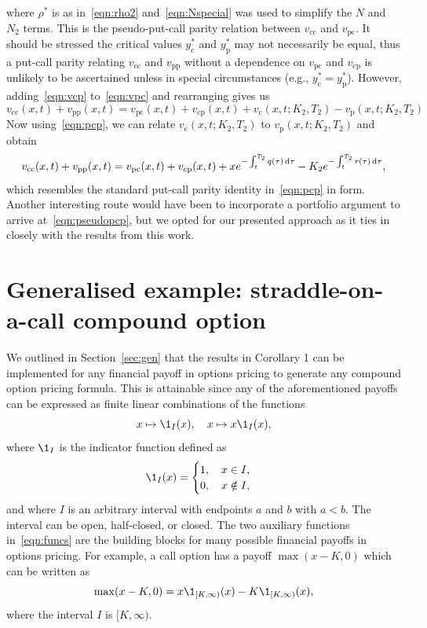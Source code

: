 where $\rho^*$ is as in~\eqref{eqn:rho2} and~\eqref{eqn:Nspecial} was used to simplify the $N$ and $N_2$ terms. This is the pseudo-put-call parity relation between $v_\text{cc}$ and $v_\text{pc}$. It should be stressed the critical values $y_\text{c}^*$ and $y_\text{p}^*$ may not necessarily be equal, thus a put-call parity relating $v_\text{cc}$ and $v_\text{pp}$ without a dependence on $v_\text{pc}$ and $v_\text{cp}$ is unlikely to be ascertained unless in special circumstances (e.g., $y_\text{c}^* = y_\text{p}^*$). However, adding~\eqref{eqn:vcp} to~\eqref{eqn:vpc} and rearranging gives us
	\begin{equation*}
		v_\text{cc}(x,t) + v_\text{pp}(x,t) = v_\text{pc}(x,t) + v_\text{cp}(x,t) + v_\text{c}(x,t; K_2, T_2) - v_\text{p}(x,t; K_2, T_2)
	\end{equation*}
Now using~\eqref{eqn:pcp}, we can relate $v_\text{c}(x,t; K_2, T_2)$ to $v_\text{p}(x,t; K_2, T_2)$ and obtain
	\begin{equation}
		\label{eqn:pseudopcp}
		v_\text{cc}(x,t) + v_\text{pp}(x,t) =  v_\text{pc}(x,t) + v_\text{cp}(x,t) + xe^{-\int_t^{T_2} q(\tau) \, \mathrm d\tau} - K_2e^{-\int_t^{T_2} r(\tau) \, \mathrm d\tau},
	\end{equation}
which resembles the standard put-call parity identity in~\eqref{eqn:pcp} in form. Another interesting route would have been to incorporate a portfolio argument to arrive at~\eqref{eqn:pseudopcp}, but we opted for our presented approach as it ties in closely with the results from this work.

\section{Generalised example: straddle-on-a-call compound option}
We outlined in Section~\ref{sec:gen} that the results in Corollary 1 can be implemented for any financial payoff in options pricing to generate any compound option pricing formula. This is attainable since any of the aforementioned payoffs can be expressed as finite linear combinations of the functions
	\begin{equation}
		\label{eqn:funcs}
		x \mapsto \1_I(x), \quad x \mapsto x\1_I(x),
	\end{equation}
where $\1_I$ is the indicator function defined as
	\begin{equation*}
		\1_I(x) = \begin{cases}
			1, \quad x \in I, \\
			0, \quad x \notin I,
		\end{cases}
	\end{equation*}
and where $I$ is an arbitrary interval with endpoints $a$ and $b$ with $a < b$. The interval can be open, half-closed, or closed. The two auxiliary functions in~\eqref{eqn:funcs} are the building blocks for many possible financial payoffs in options pricing. For example, a call option has a payoff $\max(x-K,0)$ which can be written as
	\begin{equation*}
		\max(x-K,0) = x\1_{[K,\infty)}(x) - K\1_{[K,\infty)}(x),
	\end{equation*}
where the interval $I$ is $[K,\infty)$.

